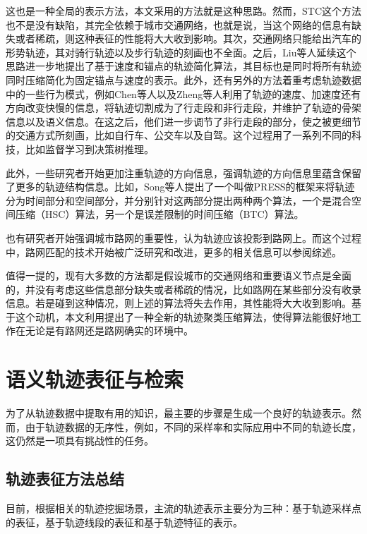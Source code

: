 这也是一种全局的表示方法，本文采用的方法就是这种思路。然而，STC这个方法也不是没有缺陷，其完全依赖于城市交通网络，也就是说，当这个网络的信息有缺失或者稀疏，则这种表征的性能将大大收到影响。其次，交通网络只能给出汽车的形势轨迹，其对骑行轨迹以及步行轨迹的刻画也不全面。之后，Liu等人延续这个思路进一步地提出了基于速度和锚点的轨迹简化算法，其目标也是同时将所有轨迹同时压缩简化为固定锚点与速度的表示。此外，还有另外的方法着重考虑轨迹数据中的一些行为模式，例如Chen等人以及Zheng等人利用了轨迹的速度、加速度还有方向改变快慢的信息，将轨迹切割成为了行走段和非行走段，并维护了轨迹的骨架信息以及语义信息。在这之后，他们进一步调节了非行走段的部分，使之被更细节的交通方式所刻画，比如自行车、公交车以及自驾。这个过程用了一系列不同的科技，比如监督学习到决策树推理。

此外，一些研究者开始更加注重轨迹的方向信息，强调轨迹的方向信息里蕴含保留了更多的轨迹结构信息。比如，Song等人提出了一个叫做PRESS的框架来将轨迹分为时间部分和空间部分，并分别针对这两部分提出两种两个算法，一个是混合空间压缩（HSC）算法，另一个是误差限制的时间压缩（BTC）算法。

也有研究者开始强调城市路网的重要性，认为轨迹应该投影到路网上。而这个过程中，路网匹配的技术开始被广泛研究和改进，更多的相关信息可以参阅综述。

值得一提的，现有大多数的方法都是假设城市的交通网络和重要语义节点是全面的，并没有考虑这些信息部分缺失或者稀疏的情况，比如路网在某些部分没有收录信息。若是碰到这种情况，则上述的算法将失去作用，其性能将大大收到影响。基于这个动机，本文利用提出了一种全新的轨迹聚类压缩算法，使得算法能很好地工作在无论是有路网还是路网确实的环境中。

\section{语义轨迹表征与检索}

为了从轨迹数据中提取有用的知识，最主要的步骤是生成一个良好的轨迹表示。然而，由于轨迹数据的无序性，例如，不同的采样率和实际应用中不同的轨迹长度，这仍然是一项具有挑战性的任务。

\subsection{轨迹表征方法总结}
目前，根据相关的轨迹挖掘场景，主流的轨迹表示主要分为三种：基于轨迹采样点的表征，基于轨迹线段的表征和基于轨迹特征的表示。

